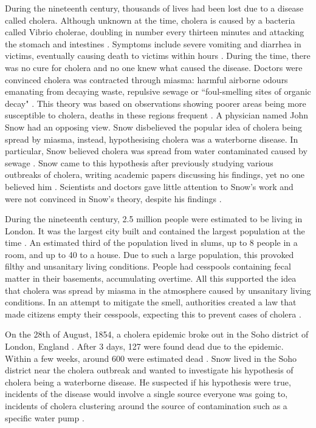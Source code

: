 \documentclass[12pt]{article}
\begin{document}
During the nineteenth century, thousands of lives had been lost due to a disease called cholera. Although unknown at the time, cholera is caused by a bacteria called Vibrio cholerae, doubling in number every thirteen minutes and attacking the stomach and intestines \cite{channel1}. Symptoms include severe vomiting and diarrhea in victims, eventually causing death to victims within hours \cite{heros, channel1}. During the time, there was no cure for cholera and no one knew what caused the disease. Doctors were convinced cholera was contracted through miasma: harmful airborne odours emanating from decaying waste, repulsive sewage or ``foul-smelling sites of organic decay" \cite{ucla, test}. This theory was based on observations showing poorer areas being more susceptible to cholera, deaths in these regions frequent \cite{heros}. A physician named John Snow had an opposing view. Snow disbelieved the popular idea of cholera being spread by miasma, instead, hypothesising cholera was a waterborne disease. In particular, Snow believed cholera was spread from water contaminated caused by sewage \cite{ucla}. Snow came to this hypothesis after previously studying various outbreaks of cholera, writing academic papers discussing his findings, yet no one believed him \cite{original}. Scientists and doctors gave little attention to Snow's work and were not convinced in Snow's theory, despite his findings \cite{ucla}. 

During the nineteenth century, 2.5 million people were estimated to be living in London. It was the largest city built and contained the largest population at the time \cite{channel1, tedtalk}. An estimated third of the population lived in slums, up to 8 people in a room, and up to 40 to a house. Due to such a large population, this provoked filthy and unsanitary living conditions. People had cesspools containing fecal matter in their basements, accumulating overtime. All this supported the idea that cholera was spread by miasma in the atmosphere caused by unsanitary living conditions. In an attempt to mitigate the smell, authorities created a law that made citizens empty their cesspools, expecting this to prevent cases of cholera \cite{tedtalk, johnson}. 

On the 28th of August, 1854, a cholera epidemic broke out in the Soho district of London, England \cite{tedtalk}. After 3 days, 127 were found dead due to the epidemic. Within a few weeks, around 600 were estimated dead \cite{youtube, tedtalk}. Snow lived in the Soho district near the cholera outbreak and wanted to investigate his hypothesis of cholera being a waterborne disease. He suspected if his hypothesis were true, incidents of the disease would involve a single source everyone was going to, incidents of cholera clustering around the source of contamination such as a specific water pump \cite{test, tedtalk, johnson}. 
\end{document}
